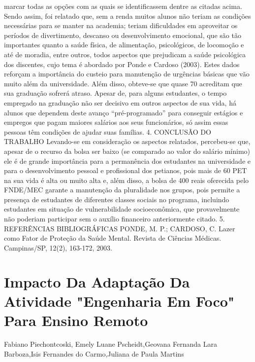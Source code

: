 marcar todas as opções com as quais se identificassem dentre as citadas acima.
Sendo assim, foi relatado que, sem a renda muitos alunos não teriam as condições
necessárias para se manter na academia; teriam dificuldades em aproveitar os períodos de
divertimento, descanso ou desenvolvimento emocional, que são tão importantes quanto a saúde
física, de alimentação, psicológicos, de locomoção e até de moradia, entre outros, todos aspectos
que prejudicam a saúde psicológica dos discentes, cujo tema é abordado por Ponde e Cardoso
(2003).
Estes dados reforçam a importância do custeio para manutenção de urgências básicas que
vão muito além da universidade. Além disso, obteve-se que quase 70%
acreditam que sua graduação sofrerá atraso. Apesar de, para alguns estudantes, o tempo
empregado na graduação não ser decisivo em outros aspectos de sua vida, há alunos que
dependem deste avanço “pré-programado” para conseguir estágios e empregos que pagam
maiores salários aos seus funcionários, só assim essas pessoas têm condições de ajudar suas
famílias.
4. CONCLUSÃO DO TRABALHO
Levando-se em consideração os aspectos relatados, percebeu-se que, apesar de o recurso
da bolsa ser baixo (se comparado ao valor do salário mínimo) ele é de grande importância para a
permanência dos estudantes na universidade e para o desenvolvimento pessoal e profissional dos
petianos, pois mais de 60%
PET na sua vida é alta ou muito alta e, além disso, a bolsa de 400 reais oferecida pelo
FNDE/MEC garante a manutenção da pluralidade nos grupos, pois permite a presença de
estudantes de diferentes classes sociais no programa, incluindo estudantes em situação de
vulnerabilidade socioeconômica, que provavelmente não poderiam participar sem o auxílio
financeiro anteriormente citado.
5. REFERÊNCIAS BIBLIOGRÁFICAS
PONDE, M. P.; CARDOSO, C. Lazer como Fator de Proteção da Saúde Mental. Revista de
Ciências Médicas. Campinas/SP, 12(2), 163-172, 2003.




\section*{Impacto Da Adaptação Da Atividade "Engenharia Em Foco" Para Ensino Remoto}

Fabiano Piechontcoski, Emely Luane Pscheidt,Geovana Fernanda Lara Barboza,Isis Fernandes do Carmo,Juliana de Paula Martins

